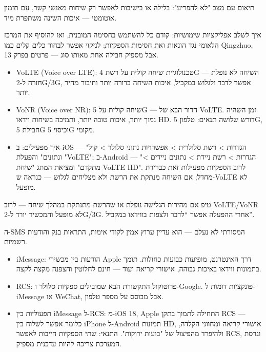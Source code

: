 תיאום עם מצב "לא להפריע": בלילה או בישיבות לאפשר רק שיחות מאנשי קשר, עם תזמון אוטומטי — איכות השינה משתפרת מיד.

איך לשלב אפליקציות שימושיות: קודם כל להשתמש בחסימה המובנית, ואז להוסיף את המרכז הלאומי נגד הונאות ואת חסימות הספקיות; לניקוי אפשר לבחור כלים קלים כמו Qingzhuo, אבל מספיק חבילה אחת מאותו סוג — פרטים בפרק 13.


\begin{itemize}
  \item VoLTE (Voice over LTE): טכנולוגיית שיחה קולית על רשת 4G — השיחה לא נופלת חזרה ל-2G/3G, אפשר לדבר ולגלוש במקביל, איכות השיחה ברורה יותר וחיבור מהיר יותר.
  \item VoNR (Voice over NR): שיחה קולית על 5G — הדור הבא של VoLTE. זמן השהיה נמוך יותר, איכות טובה יותר, ותמיכה בשיחות וידאו HD. דורש שלושה תנאים: טלפון 5G, חבילת 5G וכיסוי 5G מקומי.
  \item איך מפעילים: ב-iOS — "הגדרות > רשת סלולרית > אפשרויות נתוני סלולר > קול ונתונים" והפעלת "VoLTE"; ב-Android — "הגדרות > רשת ניידת > נתונים ניידים > מתקדם" ומציאת המתג "שיחת VoLTE HD". לרוב הספקיות מפעילות זאת כברירת מחדל; אם השיחה מנתקת את הרשת ולא מצליחים לגלוש — כנראה ש-VoLTE לא מופעל.
\end{itemize}

\begin{tcbinfo}{טיפ}
אם מהירות הגלישה נופלת או שהרשת מתנתקת במהלך שיחה — לרוב VoLTE/VoNR לא מופעל והמכשיר יורד ל-2G/3G. אחרי ההפעלה אפשר “לדבר ולצפות בווידאו במקביל”.

\end{tcbinfo}


ה-SMS המסורתי לא נעלם — הוא עדיין ערוץ אמין לקודי אימות, התראות בנק והודעות רשמיות.

\begin{itemize}
  \item iMessage: הודעות בין מכשירי Apple דרך האינטרנט, מופיעות כבועות כחולות. תומך בתמונות ווידאו באיכות גבוהה, אישורי קריאה ועוד — חינם לחלוטין והצפנה מקצה לקצה.
  \item RCS: פרוטוקול התקשורת הבא שמובילים ספקיות סלולר ו-Google. פונקציות דומות ל-iMessage או WeChat, אבל מבוסס על מספר טלפון.
  \item תפעוליות בין iMessage ל-RCS: מ-iOS 18, Apple התחילה לתמוך בתקן RCS — כלומר אפשר לשלוח בין iPhone ל-Android תמונות HD, אישורי קריאה ומחווני הקלדה, ולהיפרד מהפיצול של "בועות ירוקות". התנאי: שתי הספקיות חייבות לאפשר RCS, וגרסת המערכת צריכה להיות עדכנית מספיק.
\end{itemize}

